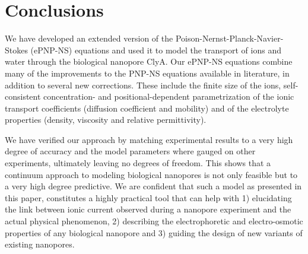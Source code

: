 \documentclass[journal=ancac3,manuscript=article,etalmode=truncate,maxauthors=0,layout=onecolumn]{achemso}
\begin{document}







\section{Conclusions}\label{sec:conclusions}

We have developed an extended version of the Poison-Nernst-Planck-Navier-Stokes (ePNP-NS) equations and used
it to model the transport of ions and water through the biological nanopore ClyA. Our ePNP-NS equations
combine many of the improvements to the PNP-NS equations available in literature, in addition to several new
corrections. These include the finite size of the ions, self-consistent concentration- and
positional-dependent parametrization of the ionic transport coefficients (diffusion coefficient and mobility)
and of the electrolyte properties (density, viscosity and relative permittivity).

We have verified our approach by matching experimental results to a very high degree of accuracy and the model
parameters where gauged on other experiments, ultimately leaving no degrees of freedom. This shows that a
continuum approach to modeling biological nanopores is not only feasible but to a very high degree predictive.
We are confident that such a model as presented in this paper, constitutes a highly practical tool that can
help with 1) elucidating the link between ionic current observed during a nanopore experiment and the actual
physical phenomenon, 2) describing the electrophoretic and electro-osmotic properties of any biological
nanopore and 3) guiding the design of new variants of existing nanopores.
\end{document}
